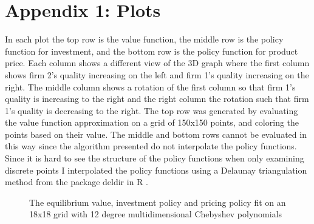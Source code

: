 \documentclass[12pt]{article}
\begin{document}



\section*{Appendix 1: Plots}

In each plot the top row is the value function, the middle row is the policy function for investment, and the bottom row is the policy function for product price. Each column shows a different view of the 3D graph where the first column shows firm 2's quality increasing on the left and firm 1's quality increasing on the right. The middle column shows a rotation of the first column so that firm 1's quality is increasing to the right and the right column the rotation such that firm 1's quality is decreasing to the right. The top row was generated by evaluating the value function approximation on a grid of 150x150 points, and coloring the points based on their value. The middle and bottom rows cannot be evaluated in this way since the algorithm presented do not interpolate the policy functions. Since it is hard to see the structure of the policy functions when only examining discrete points I interpolated the policy functions using a Delaunay triangulation method from the package deldir in R \citep{deldir}.

\begin{figure}[H]
  \centering
  \caption{The equilibrium value, investment policy and pricing policy fit on an 18x18 grid with 12 degree multidimensional Chebyshev polynomials}
\end{figure}
\end{document}
